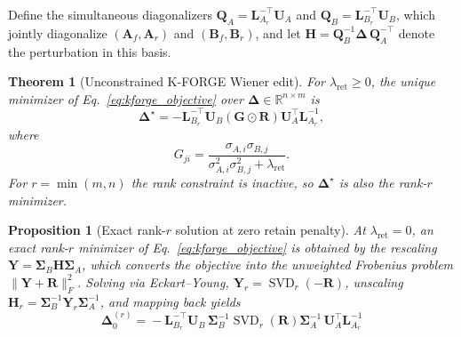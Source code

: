 \documentclass[11pt]{article}
\newtheorem{theorem}{Theorem}
\newtheorem{proposition}{Proposition}
\begin{document}
Define the simultaneous diagonalizers $\mathbf{Q}_A = \mathbf{L}_{A_r}^{-\top}\mathbf{U}_A$ and $\mathbf{Q}_B = \mathbf{L}_{B_r}^{-\top}\mathbf{U}_B$, which jointly diagonalize $(\mathbf{A}_f,\mathbf{A}_r)$ and $(\mathbf{B}_f,\mathbf{B}_r)$, and let $\mathbf{H} = \mathbf{Q}_B^{-1}\mathbf{\Delta}\,\mathbf{Q}_A^{-\top}$ denote the perturbation in this basis.

\begin{theorem}[Unconstrained K-FORGE Wiener edit]
\label{thm:two_fisher_gsvd}
For $\lambda_{\mathrm{ret}}\geq 0$, the unique minimizer of Eq.~\ref{eq:kforge_objective} over $\mathbf{\Delta}\in\mathbb{R}^{n\times m}$ is
\begin{equation}
    \mathbf{\Delta}^\star
    =
    -\mathbf{L}_{B_r}^{-\top}
    \mathbf{U}_B
    (\mathbf{G} \odot \mathbf{R})
    \mathbf{U}_A^\top
    \mathbf{L}_{A_r}^{-1},
\label{eq:kforge_delta}
\end{equation}
where
\begin{equation}
    G_{ji}
    =
    \frac{\sigma_{A,i}\sigma_{B,j}}
    {\sigma_{A,i}^2\sigma_{B,j}^2+\lambda_{\mathrm{ret}}}.
\end{equation}
For $r=\min(m,n)$ the rank constraint is inactive, so $\mathbf{\Delta}^\star$ is also the rank-$r$ minimizer.
\end{theorem}

\begin{proposition}[Exact rank-$r$ solution at zero retain penalty]
\label{prop:rankr_lam0}
At $\lambda_{\mathrm{ret}}=0$, an exact rank-$r$ minimizer of Eq.~\ref{eq:kforge_objective} is obtained by the rescaling $\mathbf{Y}=\mathbf{\Sigma}_B\mathbf{H}\mathbf{\Sigma}_A$, which converts the objective into the unweighted Frobenius problem $\lVert\mathbf{Y}+\mathbf{R}\rVert_F^2$. Solving via Eckart--Young, $\mathbf{Y}_r=\operatorname{SVD}_r(-\mathbf{R})$, unscaling $\mathbf{H}_r=\mathbf{\Sigma}_B^{-1}\mathbf{Y}_r\mathbf{\Sigma}_A^{-1}$, and mapping back yields
\begin{equation}
    \mathbf{\Delta}^{\!(\!r\!)\!}_{0}\!=\!\!-\!\mathbf{L}_{B_r}^{-\top}\!\mathbf{U}_B\,\mathbf{\Sigma}_B^{-1}\operatorname{SVD}_r(\mathbf{R})\mathbf{\Sigma}_A^{-1}\,
    \!\mathbf{U}_A^\top\!\mathbf{L}_{A_r}^{-1}
\end{equation}
\end{proposition}
\end{document}
